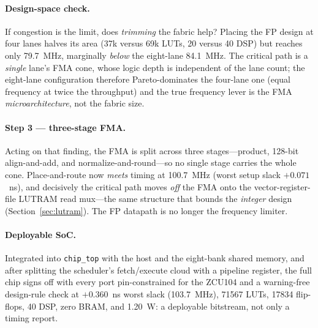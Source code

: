 \documentclass[12pt,a4paper,oneside]{report}
\newcommand{\code}[1]{\texttt{#1}}
\begin{document}
\paragraph{Design-space check.} If congestion is the limit, does \emph{trimming}
the fabric help? Placing the FP design at four lanes halves its area (37k versus
69k LUTs, 20 versus 40 DSP) but reaches only \SI{79.7}{\mega\hertz}, marginally
\emph{below} the eight-lane \SI{84.1}{\mega\hertz}. The critical path is a
\emph{single} lane's FMA cone, whose logic depth is independent of the lane count;
the eight-lane configuration therefore Pareto-dominates the four-lane one (equal
frequency at twice the throughput) and the true frequency lever is the FMA
\emph{microarchitecture}, not the fabric size.

\paragraph{Step 3 --- three-stage FMA.} Acting on that finding, the FMA is split
across three stages---product, 128-bit align-and-add, and normalize-and-round---so
no single stage carries the whole cone. Place-and-route now \emph{meets} timing at
\SI{100.7}{\mega\hertz} (worst setup slack $+0.071$~ns), and decisively the
critical path moves \emph{off} the FMA onto the vector-register-file LUTRAM read
mux---the same structure that bounds the \emph{integer} design
(Section~\ref{sec:lutram}). The FP datapath is no longer the frequency limiter.

\paragraph{Deployable SoC.} Integrated into \code{chip\_top} with the host and the
eight-bank shared memory, and after splitting the scheduler's fetch/execute cloud
with a pipeline register, the full chip signs off with every port pin-constrained
for the ZCU104 and a warning-free design-rule check at $+0.360$~ns worst slack
(\SI{103.7}{\mega\hertz}), \num{71567} LUTs, \num{17834} flip-flops, 40 DSP, zero
BRAM, and \SI{1.20}{\watt}: a deployable bitstream, not only a timing report.
\end{document}
